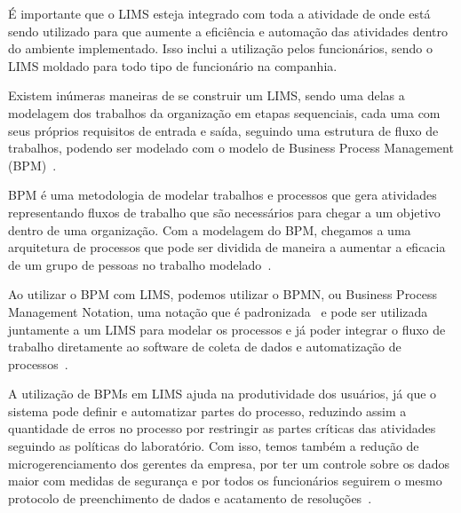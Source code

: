 
É importante que o LIMS esteja integrado com toda a atividade de onde está sendo utilizado para que aumente a eficiência e automação das atividades dentro do ambiente implementado. Isso inclui a utilização pelos funcionários, sendo o LIMS moldado para todo tipo de funcionário na companhia.

Existem inúmeras maneiras de se construir um LIMS, sendo uma delas a modelagem dos trabalhos da organização em etapas sequenciais, cada uma com seus próprios requisitos de entrada e saída, seguindo uma estrutura de fluxo de trabalhos, podendo ser modelado com o modelo de Business Process Management (BPM)~\cite{Holzmuller-Laue2014ImprovedAutomation}.

BPM é uma metodologia de modelar trabalhos e processos que gera atividades representando fluxos de trabalho que são necessários para chegar a um objetivo dentro de uma organização. Com a modelagem do BPM, chegamos a uma arquitetura de processos que pode ser dividida de maneira a aumentar a eficacia de um grupo de pessoas no trabalho modelado~\cite{Hammer2015WhatManagement}.


Ao utilizar o BPM com LIMS, podemos utilizar o BPMN, ou Business Process Management Notation, uma notação que é padronizada~\cite{Chinosi2012BPMN:Standard} e pode ser utilizada juntamente a um LIMS para modelar os processos e já poder integrar o fluxo de trabalho diretamente ao software de coleta de dados e automatização de processos~\cite{Holzmuller-Laue2013AAutomation}.


A utilização de BPMs em LIMS ajuda na produtividade dos usuários, já que o sistema pode definir e automatizar partes do processo, reduzindo assim a quantidade de erros no processo por restringir as partes críticas das atividades seguindo as políticas do laboratório.
Com isso, temos também a redução de microgerenciamento dos gerentes da empresa, por ter um controle sobre os dados maior com medidas de segurança e por todos os funcionários seguirem o mesmo protocolo de preenchimento de dados e acatamento de resoluções~\cite{BenefitsManagement}.


